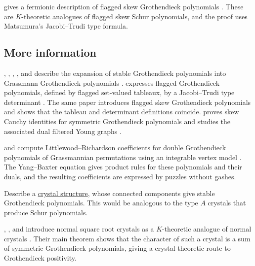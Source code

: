  gives a fermionic description of flagged skew
Grothendieck polynomials \cite{Iwao2023x}.  These are $K$-theoretic analogues
of flagged skew Schur polynomials, and the proof uses Matsumura's
Jacobi--Trudi type formula.



\subsection[grothendieckStableMoreInfo]{More information}


, , ,
, and  describe the expansion of
stable Grothendieck polynomials into Grassmann Grothendieck polynomials
\cite{BuchKreschShimozonoTamvakisYong2007}.
 expresses flagged Grothendieck polynomials, defined by
flagged set-valued tableaux, by a Jacobi--Trudi type determinant
\cite{Matsumura2018}.  The same paper introduces flagged skew Grothendieck
polynomials and shows that the tableau and determinant definitions coincide.
 proves skew Cauchy identities for symmetric
Grothendieck polynomials and studies the associated dual filtered Young graphs
\cite{Yeliussizov2019SkewGrothendieck}.


 and  compute
Littlewood--Richardson coefficients for double Grothendieck polynomials of
Grassmannian permutations using an integrable vertex model
\cite{WheelerZinnJustin2017}.  The Yang--Baxter equation gives product rules
for these polynomials and their duals, and the resulting coefficients are
expressed by puzzles without gashes.

\begin{problem}
Describe a \hyperref[crystals]{crystal structure}, whose connected components give stable Grothendieck polynomials.
This would be analogous to the type $A$ crystals that produce Schur polynomials.
\end{problem}

, , and  introduce
normal square root crystals as a $K$-theoretic analogue of normal crystals
\cite{MarbergTongYu2025x}.  Their main theorem shows that the character of
such a crystal is a sum of symmetric Grothendieck polynomials, giving a
crystal-theoretic route to Grothendieck positivity.



